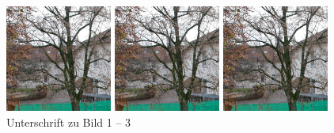 \documentclass{article}
\begin{document}
\begin{figure}
	\begin{minipage}[b]{.3\linewidth}
		\includegraphics[width=3.5cm]{testbild.jpg} 
	\end{minipage}\hfill
	\begin{minipage}[b]{.3\linewidth}
		\includegraphics[width=3.5cm]{testbild.jpg}
	\end{minipage}\hfill
		\begin{minipage}[b]{.3\linewidth}
		\includegraphics[width=3.5cm]{testbild.jpg}
	\end{minipage}
	\caption*{Unterschrift zu Bild 1 -- 3}
\end{figure} 
\end{document}
